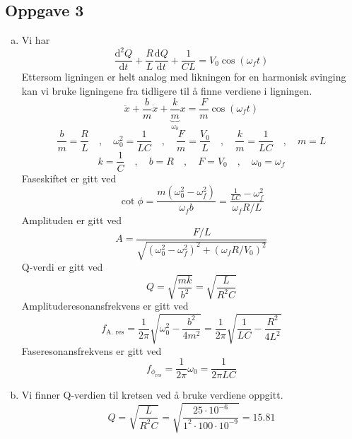 \documentclass{article}
\begin{document}
\subsection*{Oppgave 3}
\begin{enumerate}[a)]
\item
Vi har
\[
\frac{\mathrm{d}^{2} Q}{\mathrm{d}t} +  \frac{R}{L} \frac{\mathrm{d}Q}{\mathrm{d}t} + \frac{1}{CL} = V_0 \cos \left(ω_ft\right) 
\]
Ettersom ligningen er helt analog med likningen for en harmonisk svinging kan vi bruke ligningene fra tidligere til å finne verdiene i ligningen. 
\[
\ddot{x} + \frac{b}{m} \dot{x} + \underbrace{\frac{k}{m}}_{ω_0} x = \frac{F}{m} \cos \left(ω_ft\right) 
\]
\[
\frac{b}{m} = \frac{R}{L} \quad , \quad ω_0^2 = \frac{1}{L C} \quad , \quad \frac{F}{m} = \frac{V_0}{L} \quad , \quad \frac{k}{m} = \frac{1}{LC} \quad , \quad m = L 
\]
\[
k = \frac{1}{C} \quad , \quad b = R \quad , \quad  F = V_0 \quad , \quad ω_0 = ω_f
\]
Faseskiftet er gitt ved 
\[
\cot ϕ = \frac{m(ω_0^2 - ω_f^2)}{ω_f b} = \frac{\frac{1}{L C} - ω_f^2}{ω_f R / L}
\]
Amplituden er gitt ved
\[
A = \frac{F / L}{\sqrt{(ω_0^2 - ω_f^2)^2 + (ω_f R / V_0)^2}}
\]
Q-verdi er gitt ved 
\[
Q = \sqrt{\frac{mk}{b^2}} = \sqrt{\frac{L}{R^2C}}
\]
Amplituderesonansfrekvens er gitt ved
\[
f_{\text{A. res}} = \frac{1}{2 \pi} \sqrt{ω_0^2 - \frac{b^2}{4m^2}} = \frac{1}{2 \pi} \sqrt{\frac{1}{LC} - \frac{R^2}{4L^2}}
\]
Faseresonansfrekvens er gitt ved
\[
f_{ϕ_{\text{res}}} = \frac{1}{2 \pi} ω_0 = \frac{1}{2πLC}
\]
\item 
Vi finner Q-verdien til kretsen ved å bruke verdiene oppgitt. 
\[
Q = \sqrt{\frac{L}{R^2C}} = \sqrt{\frac{25 ⋅ 10^{-6}}{1^2 ⋅  100 ⋅ 10^{-9}}} = 15.81
\]
\end{enumerate}
\end{document}

